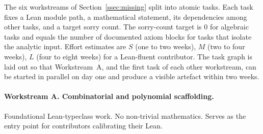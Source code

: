 \documentclass[11pt,a4paper]{article}
\theoremstyle{definition}
\begin{document}
The six workstreams of Section~\ref{ssec:missing} split into atomic
tasks. Each task fixes a Lean module path, a mathematical statement,
its dependencies among other tasks, and a target sorry count. The
sorry-count target is $0$ for algebraic tasks and equals the number
of documented axiom blocks for tasks that isolate the analytic input.
Effort estimates are $S$ (one to two weeks), $M$ (two to four weeks),
$L$ (four to eight weeks) for a Lean-fluent contributor. The task
graph is laid out so that Workstream~A, and the first task of each
other workstream, can be started in parallel on day one and produce a
visible artefact within two weeks.

\paragraph{Workstream A. Combinatorial and polynomial scaffolding.}
Foundational Lean-typeclass work. No non-trivial mathematics.
Serves as the entry point for contributors calibrating their Lean.
\end{document}
